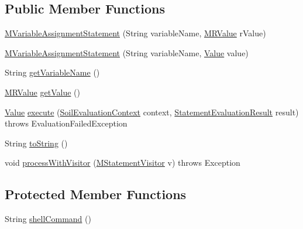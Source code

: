\subsection*{Public Member Functions}
\begin{DoxyCompactItemize}
\item 
\hyperlink{classorg_1_1tzi_1_1use_1_1uml_1_1sys_1_1soil_1_1_m_variable_assignment_statement_a8a446779dfd7a2ce0ccc01729e3ec497}{M\-Variable\-Assignment\-Statement} (String variable\-Name, \hyperlink{classorg_1_1tzi_1_1use_1_1uml_1_1sys_1_1soil_1_1_m_r_value}{M\-R\-Value} r\-Value)
\item 
\hyperlink{classorg_1_1tzi_1_1use_1_1uml_1_1sys_1_1soil_1_1_m_variable_assignment_statement_a965453ec5081dd6d0f39f5fa9341de12}{M\-Variable\-Assignment\-Statement} (String variable\-Name, \hyperlink{classorg_1_1tzi_1_1use_1_1uml_1_1ocl_1_1value_1_1_value}{Value} value)
\item 
String \hyperlink{classorg_1_1tzi_1_1use_1_1uml_1_1sys_1_1soil_1_1_m_variable_assignment_statement_a5d3a0b1815fc910b01c701ad4b5ee073}{get\-Variable\-Name} ()
\item 
\hyperlink{classorg_1_1tzi_1_1use_1_1uml_1_1sys_1_1soil_1_1_m_r_value}{M\-R\-Value} \hyperlink{classorg_1_1tzi_1_1use_1_1uml_1_1sys_1_1soil_1_1_m_variable_assignment_statement_a512dc0a4389c510a69ef02c8216f87b2}{get\-Value} ()
\item 
\hyperlink{classorg_1_1tzi_1_1use_1_1uml_1_1ocl_1_1value_1_1_value}{Value} \hyperlink{classorg_1_1tzi_1_1use_1_1uml_1_1sys_1_1soil_1_1_m_variable_assignment_statement_aa40f050b9688e0111800b6ad8531869e}{execute} (\hyperlink{classorg_1_1tzi_1_1use_1_1uml_1_1sys_1_1soil_1_1_soil_evaluation_context}{Soil\-Evaluation\-Context} context, \hyperlink{classorg_1_1tzi_1_1use_1_1uml_1_1sys_1_1_statement_evaluation_result}{Statement\-Evaluation\-Result} result)  throws Evaluation\-Failed\-Exception 
\item 
String \hyperlink{classorg_1_1tzi_1_1use_1_1uml_1_1sys_1_1soil_1_1_m_variable_assignment_statement_a301048f20d9dd76204637eff8c2df177}{to\-String} ()
\item 
void \hyperlink{classorg_1_1tzi_1_1use_1_1uml_1_1sys_1_1soil_1_1_m_variable_assignment_statement_a55204a6d0755135a8cdbc9d8bae55e95}{process\-With\-Visitor} (\hyperlink{interfaceorg_1_1tzi_1_1use_1_1uml_1_1sys_1_1soil_1_1_m_statement_visitor}{M\-Statement\-Visitor} v)  throws Exception 
\end{DoxyCompactItemize}
\subsection*{Protected Member Functions}
\begin{DoxyCompactItemize}
\item 
String \hyperlink{classorg_1_1tzi_1_1use_1_1uml_1_1sys_1_1soil_1_1_m_variable_assignment_statement_a3ec02c4d9ef31deb18c8f767a4f770c8}{shell\-Command} ()
\end{DoxyCompactItemize}


